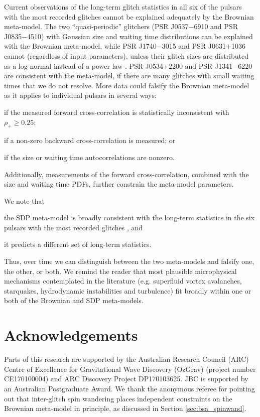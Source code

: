 Current observations of the long-term glitch statistics in all six of the pulsars with the most recorded glitches cannot be explained adequately by the Brownian meta-model. The two ``quasi-periodic'' glitchers (PSR J0537$-$6910 and PSR J0835$-$4510) with Gaussian size and waiting time distributions \citep{Howitt2018, Fuentes2019} can be explained with the Brownian meta-model, while PSR J1740$-$3015 and PSR J0631$+$1036 cannot (regardless of input parameters), unless their glitch sizes are distributed as a log-normal instead of a power law \citep{Fuentes2019}. PSR J0534$+$2200 and PSR J1341$-$6220 are consistent with the meta-model, if there are many glitches with small waiting times that we do not resolve. More data could falsify the Brownian meta-model as it applies to individual pulsars in several ways: \begin{enumerate*} \item if the measured forward cross-correlation is statistically inconsistent with $\rho_+ \geq 0.25$; \item if a non-zero backward cross-correlation is measured; or \item if the size or waiting time autocorrelations are nonzero.\end{enumerate*} Additionally, measurements of the forward cross-correlation, combined with the size and waiting time PDFs, further constrain the meta-model parameters.

We note that \begin{enumerate*} \item the SDP meta-model is broadly consistent with the long-term statistics in the six pulsars with the most recorded glitches \citep{Carlin2019quasi,Carlin2019ac}, and \item it predicts a different set of long-term statistics.\end{enumerate*} Thus, over time we can distinguish between the two meta-models and falsify one, the other, or both. We remind the reader that most plausible microphysical mechanisms contemplated in the literature (e.g. superfluid vortex avalanches, starquakes, hydrodynamic instabilities and turbulence) fit broadly within one or both of the Brownian and SDP meta-models.

\section*{Acknowledgements}
Parts of this research are supported by the Australian Research Council (ARC) Centre
of Excellence for Gravitational Wave Discovery (OzGrav) (project number
CE170100004) and ARC Discovery Project DP170103625. JBC is supported by an Australian Postgraduate Award. We thank the anonymous referee for pointing out that inter-glitch spin wandering places independent constraints on the Brownian meta-model in principle, as discussed in Section \ref{sec:bsa_spinwand}.

